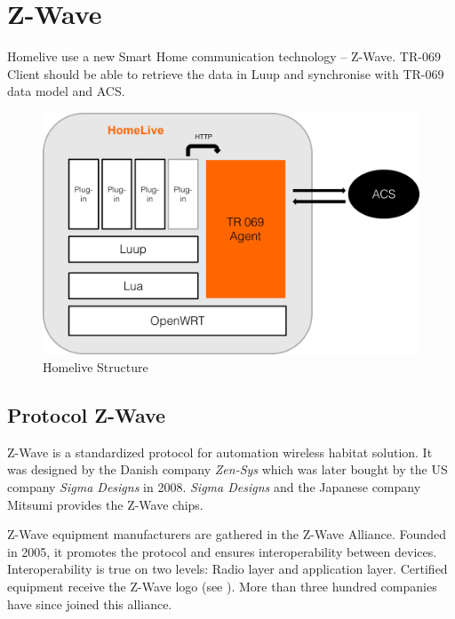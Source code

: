 
\chapter{Z-Wave} %

\label{Chapter6} %

Homelive use a new Smart Home communication technology -- Z-Wave. TR-069 Client should be able to retrieve the data in Luup and synchronise with TR-069 data model and ACS.

\begin{figure}[htbp]
	\centering
		\includegraphics[width=12cm]{Figures/homelivestructure.png}
	\caption[Homelive Structure]{Homelive Structure}
	\label{fig:homelive}
\end{figure}

\section{Protocol Z-Wave}
Z-Wave is a standardized protocol for automation wireless habitat solution. It was designed by the Danish company \textit{Zen-Sys} which was later bought by the US company \textit{Sigma Designs} in 2008. \textit{Sigma Designs} and the Japanese company Mitsumi provides the Z-Wave chips.

Z-Wave equipment manufacturers are gathered in the Z-Wave Alliance. Founded in 2005, it promotes the protocol and ensures interoperability between devices. Interoperability is true on two levels: Radio layer and application layer. Certified equipment receive the Z-Wave logo (see ). More than three hundred companies have since joined this alliance.

